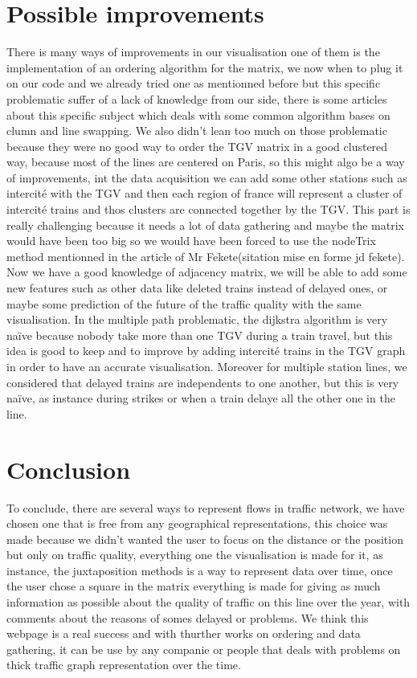 \documentclass{vgtc}
\begin{document}
\section{Possible improvements}

There is many ways of improvements in our visualisation one of them is the implementation of an ordering algorithm for the matrix, we now when to plug it on our code and we already tried one as mentionned before but this specific problematic suffer of a lack of knowledge from our side, there is some articles about this specific subject which deals with some common algorithm bases on clumn and line swapping.\cite{visu_reseaux}
We also didn't lean too much on those problematic because they were no good way to order the TGV matrix in a good clustered way, because most of the lines are centered on Paris, so this might algo be a way of improvements, int the data acquisition we can add some other stations such as intercité with the TGV and then each region of france will represent a cluster of intercité trains and thos clusters are connected together by the TGV. This part is really challenging because it needs a lot of data gathering and maybe the matrix would have been too big so we would have been forced to use the nodeTrix method mentionned in the article of Mr Fekete(sitation mise en forme jd fekete). Now we have a good knowledge of adjacency matrix, we will be able to add some new features such as other data like deleted trains instead of delayed ones, or maybe some prediction of the future of the traffic quality with the same visualisation.
In the multiple path problematic, the dijkstra algorithm is very naïve because nobody take more than one TGV during a train travel, but this idea is good to keep and to improve by adding intercité trains in the TGV graph in order to have an accurate visualisation. Moreover for multiple station lines, we considered that delayed trains are independents to one another, but this is very naïve, as instance during strikes or when a train delaye all the other one in the line.
\section{Conclusion}
To conclude, there are several ways to represent flows in traffic network, we have chosen one that is free from any geographical representations, this choice was made because we didn't wanted the user to focus on the distance or the position but only on traffic quality, everything one the visualisation is made for it, as instance, the juxtaposition methods is a way to represent data over time, once the user chose a square in the matrix everything is made for giving as much information as possible about the quality of traffic on this line over the year, with comments about the reasons of somes delayed or problems. We think this webpage is a real success and with thurther works on ordering and data gathering, it can be use by any companie or people that deals with problems on thick traffic graph representation over the time.
\end{document}
